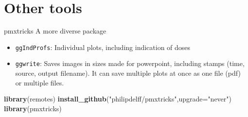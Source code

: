 \documentclass[
  8pt,
  ignorenonframetext,
  aspectratio=169]{beamer}
\newenvironment{Shaded}{\begin{snugshade}}{\end{snugshade}}
\newcommand{\DataTypeTok}[1]{\textcolor[rgb]{0.13,0.29,0.53}{#1}}
\newcommand{\KeywordTok}[1]{\textcolor[rgb]{0.13,0.29,0.53}{\textbf{#1}}}
\newcommand{\NormalTok}[1]{#1}
\newcommand{\StringTok}[1]{\textcolor[rgb]{0.31,0.60,0.02}{#1}}
\providecommand{\tightlist}{%
  \setlength{\itemsep}{0pt}\setlength{\parskip}{0pt}}
\begin{document}
\hypertarget{other-tools}{%
\section{Other tools}\label{other-tools}}

\begin{frame}[fragile]{pmxtricks}
\protect\hypertarget{pmxtricks}{}
A more diverse package

\begin{itemize}
\tightlist
\item
  \texttt{ggIndProfs}: Individual plots, including indication of doses
\item
  \texttt{ggwrite}: Saves images in sizes made for powerpoint, including
  stamps (time, source, output filename). It can save multiple plots at
  once as one file (pdf) or multiple files.
\end{itemize}

\begin{Shaded}
\begin{Highlighting}[]
\KeywordTok{library}\NormalTok{(remotes)}
\KeywordTok{install\_github}\NormalTok{(}\StringTok{"philipdelff/pmxtricks"}\NormalTok{,}\DataTypeTok{upgrade=}\StringTok{"never"}\NormalTok{)}
\KeywordTok{library}\NormalTok{(pmxtricks)}
\end{Highlighting}
\end{Shaded}
\end{frame}
\end{document}
